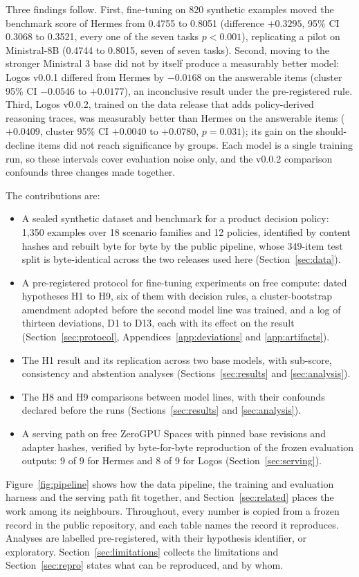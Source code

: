 Three findings follow. First, fine-tuning on 820 synthetic examples moved the benchmark score of Hermes from 0.4755 to 0.8051 (difference $+0.3295$, 95\% CI 0.3068 to 0.3521, every one of the seven tasks $p<0.001$), replicating a pilot on Ministral-8B (0.4744 to 0.8015, seven of seven tasks). Second, moving to the stronger Ministral 3 base did not by itself produce a measurably better model: Logos v0.0.1 differed from Hermes by $-0.0168$ on the answerable items (cluster 95\% CI $-0.0546$ to $+0.0177$), an inconclusive result under the pre-registered rule. Third, Logos v0.0.2, trained on the data release that adds policy-derived reasoning traces, was measurably better than Hermes on the answerable items ($+0.0409$, cluster 95\% CI $+0.0040$ to $+0.0780$, $p=0.031$); its gain on the should-decline items did not reach significance by groups. Each model is a single training run, so these intervals cover evaluation noise only, and the v0.0.2 comparison confounds three changes made together.

The contributions are:
\begin{itemize}
  \item A sealed synthetic dataset and benchmark for a product decision policy: 1,350 examples over 18 scenario families and 12 policies, identified by content hashes and rebuilt byte for byte by the public pipeline, whose 349-item test split is byte-identical across the two releases used here (Section~\ref{sec:data}).
  \item A pre-registered protocol for fine-tuning experiments on free compute: dated hypotheses H1 to H9, six of them with decision rules, a cluster-bootstrap amendment adopted before the second model line was trained, and a log of thirteen deviations, D1 to D13, each with its effect on the result (Section~\ref{sec:protocol}, Appendices~\ref{app:deviations} and \ref{app:artifacts}).
  \item The H1 result and its replication across two base models, with sub-score, consistency and abstention analyses (Sections~\ref{sec:results} and \ref{sec:analysis}).
  \item The H8 and H9 comparisons between model lines, with their confounds declared before the runs (Sections~\ref{sec:results} and \ref{sec:analysis}).
  \item A serving path on free ZeroGPU Spaces with pinned base revisions and adapter hashes, verified by byte-for-byte reproduction of the frozen evaluation outputs: 9 of 9 for Hermes and 8 of 9 for Logos (Section~\ref{sec:serving}).
\end{itemize}

Figure~\ref{fig:pipeline} shows how the data pipeline, the training and evaluation harness and the serving path fit together, and Section~\ref{sec:related} places the work among its neighbours. Throughout, every number is copied from a frozen record in the public repository, and each table names the record it reproduces. Analyses are labelled pre-registered, with their hypothesis identifier, or exploratory. Section~\ref{sec:limitations} collects the limitations and Section~\ref{sec:repro} states what can be reproduced, and by whom.
